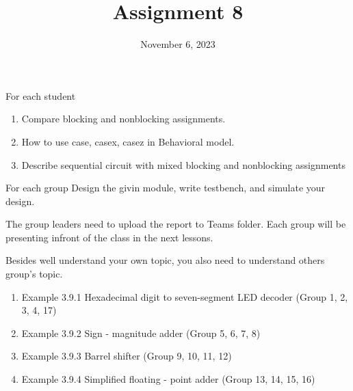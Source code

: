 \documentclass{vhdl-assignment}
\title{Assignment 8}
\date{November 6, 2023}
\begin{document}
\maketitle
\thispagestyle{fancy}

\begin{problem}{For each student}
    \begin{enumerate}
        \item Compare blocking and nonblocking assignments.
        \item How to use case, casex, casez in Behavioral model.
        \item Describe sequential circuit with mixed blocking and nonblocking assignments
    \end{enumerate}

\end{problem}

\begin{problem}{For each group}
    Design the givin module, write testbench, and simulate your design.

    The group leaders need to upload the report to Teams folder. Each group will be presenting infront of the class in the next lessons.

    Besides well understand your own topic, you also need to understand others group's topic.
    
    \begin{enumerate}
        \item Example 3.9.1 Hexadecimal digit to seven-segment LED decoder (Group 1, 2, 3, 4, 17)
        \item Example 3.9.2 Sign - magnitude adder (Group 5, 6, 7, 8)
        \item Example 3.9.3 Barrel shifter (Group 9, 10, 11, 12)
        \item Example 3.9.4 Simplified floating - point adder (Group 13, 14, 15, 16)
    \end{enumerate}


\end{problem}
\end{document}
